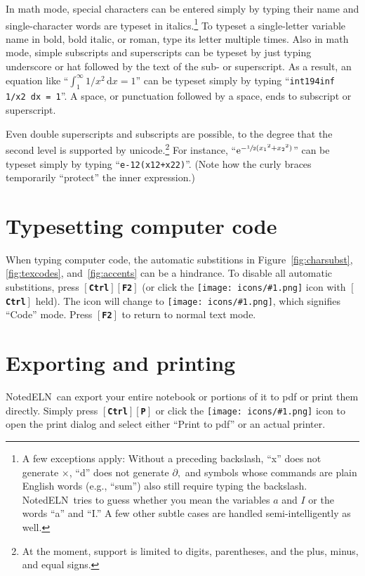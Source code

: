 \documentclass[11pt]{report}
\def\keystroke#1{$\left[\right.\!${\tt\bfseries #1}$\!\left.\right]$}
\def\key#1{\keystroke{#1}}
\def\keycombo#1#2{\keystroke{#1}\keystroke{#2}}
\def\keycontrol#1{\keycombo{Ctrl}{#1}}
\def\icon#1{\raise-2pt\hbox{\texttt{[image: icons/\#1.png]}}}
\newcommand{\NotedELN}{NotedELN} %
\begin{document}
In math mode, special characters can be entered simply by typing their
name and single-character words are typeset in italics.\footnote{A few
  exceptions apply: Without a preceding backslash, ``x'' does not
  generate $\times$, ``d'' does not generate $\partial,$ and symbols
  whose commands are plain English words (e.g., ``sum'') also still
  require typing the backslash. \NotedELN\ tries to guess whether you
  mean the variables $a$ and $I$ or the words ``a'' and ``I.'' A few
  other subtle cases are handled semi-intelligently as well.} To
typeset a single-letter variable name in bold, bold italic, or roman,
type its letter multiple times. Also in math mode, simple subscripts
and superscripts can be typeset by just typing underscore or hat
followed by the text of the sub- or superscript. As a result, an
equation like ``$\int_1^\infty 1/x^2\, \mathrm{d}x = 1$'' can be
typeset simply by typing ``{\tt{int1\char94inf 1/x2
    dx = 1}}''. A space, or punctuation followed by a space, ends to
subscript or superscript.

Even double superscripts and subscripts are possible,
to the degree that the second level is supported by
unicode.\footnote{At the moment, support is limited to digits,
  parentheses, and the plus, minus, and equal signs.} For
instance, ``$\mathrm{e}^{-\sfrac12(x_1{}^2+x_2{}^2)}$'' can be typeset simply by
typing
``{\tt{e-12(x12+x22)}}''. (Note
how the curly braces temporarily ``protect'' the inner expression.)

\section{Typesetting computer code}\label{sec:codemode}

When typing computer code, the automatic substitions in
Figure~\ref{fig:charsubst}, \ref{fig:texcodes}, and~\ref{fig:accents} can be a
hindrance. To disable all automatic substitions, press \keycontrol{F2}
(or click the \icon{type} icon with \key{Ctrl} held). The icon will
change to \icon{type-code}, which signifies ``Code'' mode. Press
\key{F2} to return to normal text mode.

\section{Exporting and printing}

\NotedELN\ can export your entire notebook or portions of it to pdf or print
them directly. Simply press \keycontrol{P} or click the
\icon{nav-print} icon
to open the print dialog and select either ``Print to pdf'' or an
actual printer.
\end{document}
